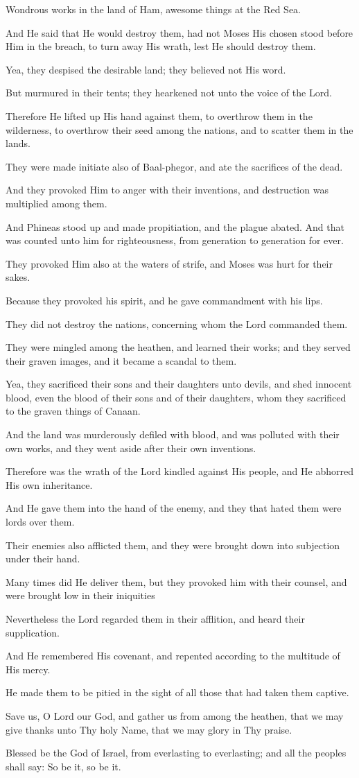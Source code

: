 Wondrous works in the land of Ham, awesome things at the Red Sea.

And He said that He would destroy them, had not Moses His chosen stood before Him in the breach, to turn away His wrath, lest He should destroy them.

Yea, they despised the desirable land; they believed not His
word.

But murmured in their tents; they hearkened not unto the voice of the Lord.

Therefore He lifted up His hand against them, to overthrow them in the wilderness, to overthrow their seed among the nations, and to scatter them in the lands.

They were made initiate also of Baal-phegor, and ate the sacrifices of the dead.

And they provoked Him to anger with their inventions, and destruction was multiplied among them.

And Phineas stood up and made propitiation, and the plague abated. And that was counted unto him for righteousness, from generation to generation for ever.

They provoked Him also at the waters of strife, and Moses was hurt for their sakes.

Because they provoked his spirit, and he gave commandment with his lips.

They did not destroy the nations, concerning whom the Lord commanded them.

They were mingled among the heathen, and learned their works; and they served their graven images, and it became a scandal to them.

Yea, they sacrificed their sons and their daughters unto devils, and shed innocent blood, even the blood of their sons and of their daughters, whom they sacrificed to the graven things of Canaan.

And the land was murderously defiled with blood, and was polluted with their own works, and they went aside after their own inventions.

Therefore was the wrath of the Lord kindled against His people, and He abhorred His own inheritance.

And He gave them into the hand of the enemy, and they that hated them were lords over them.

Their enemies also afflicted them, and they were brought down into subjection under their hand.

Many times did He deliver them, but they provoked him with their counsel, and were brought low in their iniquities

Nevertheless the Lord regarded them in their afflition, and heard their supplication.

And He remembered His covenant, and repented according to the multitude of His mercy.

He made them to be pitied in the sight of all those that had taken them captive.

Save us, O Lord our God, and gather us from among the heathen, that we may give thanks unto Thy holy Name, that we may glory in Thy praise.

Blessed be the God of Israel, from everlasting to everlasting; and all the peoples shall say: So be it, so be it.
